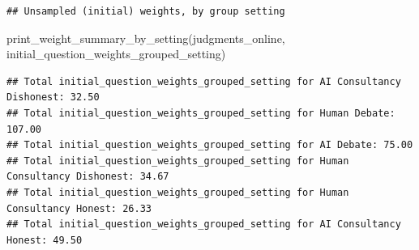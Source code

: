 \documentclass[
]{article}
\newenvironment{Shaded}{\begin{snugshade}}{\end{snugshade}}
\newcommand{\NormalTok}[1]{#1}
\newcommand{\StringTok}[1]{\textcolor[rgb]{0.31,0.60,0.02}{#1}}
\begin{document}
\begin{verbatim}
## Unsampled (initial) weights, by group setting
\end{verbatim}

\begin{Shaded}
\begin{Highlighting}[]
\NormalTok{print\_weight\_summary\_by\_setting(judgments\_online, }\StringTok{\textquotesingle{}initial\_question\_weights\_grouped\_setting\textquotesingle{}}\NormalTok{)}
\end{Highlighting}
\end{Shaded}

\begin{verbatim}
## Total initial_question_weights_grouped_setting for AI Consultancy Dishonest: 32.50
## Total initial_question_weights_grouped_setting for Human Debate: 107.00
## Total initial_question_weights_grouped_setting for AI Debate: 75.00
## Total initial_question_weights_grouped_setting for Human Consultancy Dishonest: 34.67
## Total initial_question_weights_grouped_setting for Human Consultancy Honest: 26.33
## Total initial_question_weights_grouped_setting for AI Consultancy Honest: 49.50
\end{verbatim}
\end{document}
